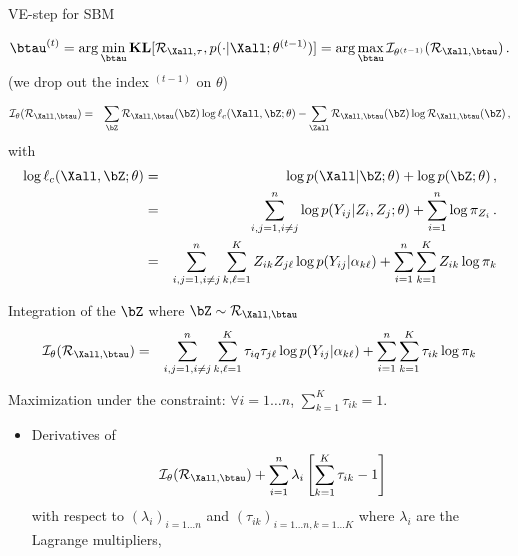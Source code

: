 \documentclass[compress,10pt]{beamer}
\begin{document}
 \begin{frame}[allowframebreaks]{VE-step for SBM}
 
\begin{equation}
 \nonumber
\btau^{(t)} = \arg \min_{\btau}  \mathbf{KL}[\mathcal{R}_{\Xall,\tau}, p(\cdot | \Xall; \theta^{(t-1)})] = \arg \max_{\btau} \mathcal{I}_{\theta^{(t-1)}}(\mathcal{R}_{\Xall,\btau}) \,.
 \end{equation}
(we drop out the index $^{(t-1)}$ on $\theta$)

\begin{eqnarray*}
 \mathcal{I}_{\theta}(\mathcal{R}_{\Xall,\btau}) &=&   \sum_{\bZ} \mathcal{R}_{\Xall,\btau}(\bZ) \log \ell_c(\Xall, \bZ; \theta) -  \sum_{\Zall} \mathcal{R}_{\Xall,\btau}(\bZ)  \log \mathcal{R}_{\Xall,\btau}({\bZ})\,,
 \end{eqnarray*}
 with
 \begin{eqnarray*}
 \log \ell_c(\Xall, \bZ; \theta) &=& \log p(\Xall |  \bZ; \theta)+ \log  p(\bZ; \theta)\,,\\
 &=& \sum_{i,j=1, i\neq j}^n  \log p(Y_{ij} |  Z_i,Z_j; \theta)  + \sum_{i=1}^n \log\pi_{Z_i}\,.\\
 &=& \sum_{i,j=1, i\neq j}^n \sum_{k,\ell=1}^K Z_{ik}Z_{j\ell}\log p(Y_{ij} |\alpha_{k\ell})+ \sum_{i=1}^n\sum_{k=1}^K Z_{ik} \log\pi_{k}
 \end{eqnarray*}
 
 
Integration of the $\bZ$ where $\bZ \sim \mathcal{R}_{\Xall,\btau}$%
 \begin{eqnarray*}
 \mathcal{I}_{\theta}(\mathcal{R}_{\Xall,\btau}) &=& \sum_{i,j=1, i\neq j}^n \sum_{k,\ell=1}^K \tau_{iq}\tau_{j\ell}\log p(Y_{ij} |\alpha_{k\ell})+ \sum_{i=1}^n\sum_{k=1}^K  \tau_{ik} \log\pi_{k} 
 \end{eqnarray*}

 
Maximization under the constraint: $\forall i =1 \dots n$, $\sum_{k=1}^K \tau_{ik}=1$.
 
 
 
\begin{itemize}
 
\item Derivatives of  $$\; \mathcal{I}_{\theta}(\mathcal{R}_{\Xall,\btau})  + \sum_{i=1}^n \lambda_i \left[ \sum_{k=1}^K \tau_{ik}-1\right]$$
 with respect to $(\lambda_i)_{i=1\dots n}$ and $(\tau_{ik})_{i=1\dots n, k=1 \dots K}$ where $\lambda_i$ are the Lagrange multipliers, 
 

\end{itemize}
\end{frame}
\end{document}
